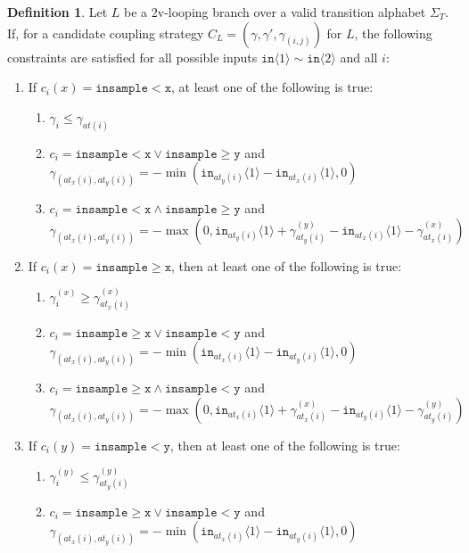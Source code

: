 \documentclass[12pt]{article}
\newcommand{\gguard}[1][x]{\texttt{insample}\geq#1}
\newcommand{\lguard}[1][x]{\texttt{insample} < #1}
\newcommand{\brangle}[1]{\langle#1 \rangle}
\theoremstyle{definition}
\newtheorem{defn}[thm]{Definition}
\begin{document}
\begin{defn}
    Let $L$ be a 2v-looping branch over a valid transition alphabet $\Sigma_T$. If, for a candidate coupling strategy $C_L = (\gamma, \gamma', \gamma_{(i, j)})$ for $L$, the following constraints are satisfied for all possible inputs $\texttt{in}\brangle{1}\sim\texttt{in}\brangle{2}$ and all $i$: \begin{enumerate}
        \item If $c_i(x) = \lguard[\texttt{x}]$, at least one of the following is true:\begin{enumerate}
            \item $\gamma_i\leq\gamma_{at(i)}$
            \item $c_i = \lguard[\texttt{x}]\lor\gguard[\texttt{y}]$ and $\gamma_{(at_x(i), at_y(i))} = -\min(\texttt{in}_{at_y(i)}\brangle{1}-\texttt{in}_{at_x(i)}\brangle{1}, 0)$ 
            \item $c_i = \lguard[\texttt{x}]\land\gguard[\texttt{y}]$ and $\gamma_{(at_x(i), at_y(i))} = -\max(0, \texttt{in}_{at_y(i)}\brangle{1}+ \gamma_{at_y(i)}^{(y)}-\texttt{in}_{at_x(i)}\brangle{1}-\gamma_{at_x(i)}^{(x)})$ 
        \end{enumerate}
        \item If $c_i(x) = \gguard[\texttt{x}]$, then at least one of the following is true: \begin{enumerate}
            \item $\gamma_i^{(x)}\geq \gamma^{(x)}_{at_x(i)}$
            \item $c_i = \gguard[\texttt{x}]\lor\lguard[\texttt{y}]$ and $\gamma_{(at_x(i), at_y(i))} = -\min(\texttt{in}_{at_x(i)}\brangle{1}-\texttt{in}_{at_y(i)}\brangle{1}, 0)$ 
            \item $c_i = \gguard[\texttt{x}]\land\lguard[\texttt{y}]$ and $\gamma_{(at_x(i), at_y(i))} = -\max(0, \texttt{in}_{at_x(i)}\brangle{1}+ \gamma_{at_x(i)}^{(x)}-\texttt{in}_{at_y(i)}\brangle{1}-\gamma_{at_y(i)}^{(y)})$ 
        \end{enumerate}
        \item If $c_i(y) = \lguard[\texttt{y}]$, then at least one of the following is true: \begin{enumerate}
            \item $\gamma_i^{(y)}\leq \gamma^{(y)}_{at_y(i)}$
            \item $c_i = \gguard[\texttt{x}]\lor\lguard[\texttt{y}]$ and $\gamma_{(at_x(i), at_y(i))} = -\min(\texttt{in}_{at_x(i)}\brangle{1}-\texttt{in}_{at_y(i)}\brangle{1}, 0)$

\end{enumerate}
\end{enumerate}
\end{defn}
\end{document}
